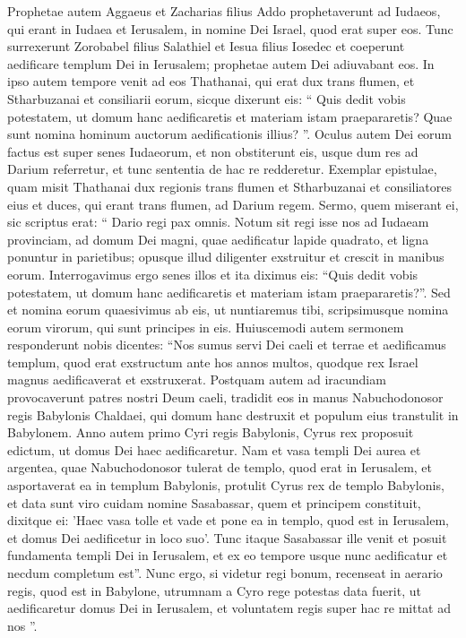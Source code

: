 \begin{biblechapter}
\begin{biblechapter}
\begin{biblechapter}
\begin{biblechapter}
\begin{biblechapter}
\verse Prophetae autem Aggaeus et Zacharias filius Addo prophetaverunt ad Iudaeos, qui erant in Iudaea et Ierusalem, in nomine Dei Israel, quod erat super eos. 
\verse Tunc surrexerunt Zorobabel filius Salathiel et Iesua filius Iosedec et coeperunt aedificare templum Dei in Ierusalem; prophetae autem Dei adiuvabant eos. 
\verse In ipso autem tempore venit ad eos Thathanai, qui erat dux trans flumen, et Stharbuzanai et consiliarii eorum, sicque dixerunt eis: “ Quis dedit vobis potestatem, ut domum hanc aedificaretis et materiam istam praepararetis? 
 \verse Quae sunt nomina hominum auctorum aedificationis illius? ”. 
\verse Oculus autem Dei eorum factus est super senes Iudaeorum, et non obstiterunt eis, usque dum res ad Darium referretur, et tunc sententia de hac re redderetur.
 \verse Exemplar epistulae, quam misit Thathanai dux regionis trans flumen et Stharbuzanai et consiliatores eius et duces, qui erant trans flumen, ad Darium regem. 
\verse Sermo, quem miserant ei, sic scriptus erat:
 “ Dario regi pax omnis. 
\verse Notum sit regi isse nos ad Iudaeam provinciam, ad domum Dei magni, quae aedificatur lapide quadrato, et ligna ponuntur in parietibus; opusque illud diligenter exstruitur et crescit in manibus eorum. 
 \verse Interrogavimus ergo senes illos et ita diximus eis: “Quis dedit vobis potestatem, ut domum hanc aedificaretis et materiam istam praepararetis?”. 
 \verse Sed et nomina eorum quaesivimus ab eis, ut nuntiaremus tibi, scripsimusque nomina eorum virorum, qui sunt principes in eis.
 \verse Huiuscemodi autem sermonem responderunt nobis dicentes: “Nos sumus servi Dei caeli et terrae et aedificamus templum, quod erat exstructum ante hos annos multos, quodque rex Israel magnus aedificaverat et exstruxerat. 
\verse Postquam autem ad iracundiam provocaverunt patres nostri Deum caeli, tradidit eos in manus Nabuchodonosor regis Babylonis Chaldaei, qui domum hanc destruxit et populum eius transtulit in Babylonem.
 \verse Anno autem primo Cyri regis Babylonis, Cyrus rex proposuit edictum, ut domus Dei haec aedificaretur. 
\verse Nam et vasa templi Dei aurea et argentea, quae Nabuchodonosor tulerat de templo, quod erat in Ierusalem, et asportaverat ea in templum Babylonis, protulit Cyrus rex de templo Babylonis, et data sunt viro cuidam nomine Sasabassar, quem et principem constituit, 
\verse dixitque ei: 'Haec vasa tolle et vade et pone ea in templo, quod est in Ierusalem, et domus Dei aedificetur in loco suo'. 
\verse Tunc itaque Sasabassar ille venit et posuit fundamenta templi Dei in Ierusalem, et ex eo tempore usque nunc aedificatur et necdum completum est”.
 \verse Nunc ergo, si videtur regi bonum, recenseat in aerario regis, quod est in Babylone, utrumnam a Cyro rege potestas data fuerit, ut aedificaretur domus Dei in Ierusalem, et voluntatem regis super hac re mittat ad nos ”.
 

\end{biblechapter}
\end{biblechapter}
\end{biblechapter}
\end{biblechapter}
\end{biblechapter}

